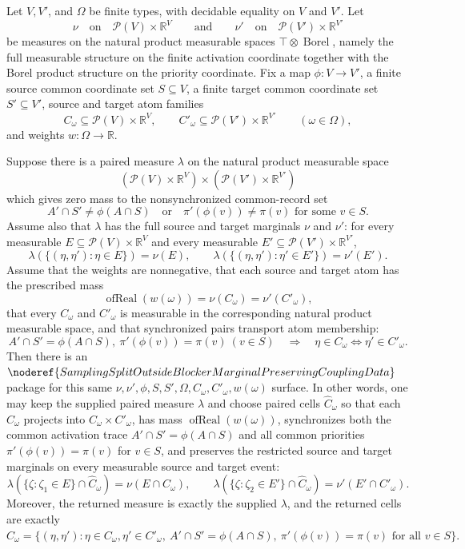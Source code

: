 \begin{helper}
Let \(V,V'\), and \(\Omega\) be finite types, with decidable equality on
\(V\) and \(V'\).  Let
\[
  \nu \quad\text{on}\quad
  \mathcal P(V)\times\mathbb R^V
  \qquad\text{and}\qquad
  \nu' \quad\text{on}\quad
  \mathcal P(V')\times\mathbb R^{V'}
\]
be measures on the natural product measurable spaces
\(\top\otimes\operatorname{Borel}\), namely the full measurable structure on
the finite activation coordinate together with the Borel product structure on
the priority coordinate.  Fix a map
\(\phi:V\to V'\), a finite source common coordinate set \(S\subseteq V\), a
finite target common coordinate set \(S'\subseteq V'\), source and target
atom families
\[
  C_\omega\subseteq \mathcal P(V)\times\mathbb R^V,\qquad
  C'_\omega\subseteq \mathcal P(V')\times\mathbb R^{V'}
  \qquad(\omega\in\Omega),
\]
and weights \(w:\Omega\to\mathbb R\).

Suppose there is a paired measure \(\lambda\) on the natural product
measurable space
\[
  (\mathcal P(V)\times\mathbb R^V)
  \times
  (\mathcal P(V')\times\mathbb R^{V'})
\]
which gives zero mass to the nonsynchronized common-record set
\[
  A'\cap S'\ne\phi(A\cap S)
  \quad\text{or}\quad
  \pi'(\phi(v))\ne\pi(v)\text{ for some }v\in S .
\]
Assume also that \(\lambda\) has the full source and target marginals
\(\nu\) and \(\nu'\): for every measurable
\(E\subseteq\mathcal P(V)\times\mathbb R^V\) and every measurable
\(E'\subseteq\mathcal P(V')\times\mathbb R^{V'}\),
\[
  \lambda(\{(\eta,\eta'):\eta\in E\})=\nu(E),
  \qquad
  \lambda(\{(\eta,\eta'):\eta'\in E'\})=\nu'(E').
\]
Assume that the weights are nonnegative, that each source and target atom has
the prescribed mass
\[
  \operatorname{ofReal}(w(\omega))=\nu(C_\omega)=\nu'(C'_\omega),
\]
that every \(C_\omega\) and \(C'_\omega\) is measurable in the corresponding
natural product measurable space, and that synchronized pairs transport atom
membership:
\[
  A'\cap S'=\phi(A\cap S),\ \pi'(\phi(v))=\pi(v)\ (v\in S)
  \quad\Longrightarrow\quad
  \eta\in C_\omega\Longleftrightarrow \eta'\in C'_\omega .
\]
Then there is an
\(\noderef{SamplingSplitOutsideBlockerMarginalPreservingCouplingData}\)
package for this same
\(\nu,\nu',\phi,S,S',\Omega,C_\omega,C'_\omega,w(\omega)\) surface.  In other
words, one may keep the supplied paired measure $\lambda$ and choose paired cells
\(\widehat C_\omega\) so that each \(\widehat C_\omega\) projects into
\(C_\omega\times C'_\omega\), has mass
\(\operatorname{ofReal}(w(\omega))\), synchronizes both the common activation
trace \(A'\cap S'=\phi(A\cap S)\) and all common priorities
\(\pi'(\phi(v))=\pi(v)\) for \(v\in S\), and preserves the restricted source
and target marginals on every measurable source and target event:
\[
  \lambda(\{\zeta:\zeta_1\in E\}\cap\widehat C_\omega)
    =\nu(E\cap C_\omega),
  \qquad
  \lambda(\{\zeta:\zeta_2\in E'\}\cap\widehat C_\omega)
    =\nu'(E'\cap C'_\omega).
\]
Moreover, the returned measure is exactly the supplied $\lambda$, and the
returned cells are exactly
\[
\widehat C_\omega=\{(\eta,\eta'): \eta\in C_\omega,
 \eta'\in C'_\omega,\ A'\cap S'=\phi(A\cap S),\
 \pi'(\phi(v))=\pi(v)\text{ for all }v\in S\}.
\]
\end{helper}
